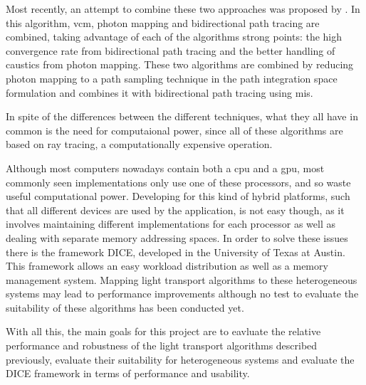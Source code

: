 Most recently, an attempt to combine these two approaches was proposed by \cite{Georgiev}. In this algorithm, \gls{vcm}, photon mapping and bidirectional path tracing are combined, taking advantage of each of the algorithms strong points: the high convergence rate from bidirectional path tracing and the better handling of caustics from photon mapping. These two algorithms are combined by reducing photon mapping to a path sampling technique in the path integration space formulation and combines it with bidirectional path tracing using \gls{mis}.

In spite of the differences between the different techniques, what they all have in common is the need for computaional power, since all of these algorithms are based on ray tracing, a computationally expensive operation.

Although most computers nowadays contain both a \gls{cpu} and a \gls{gpu}, most commonly seen implementations only use one of these processors, and so waste useful computational power. Developing for this kind of hybrid platforms, such that all different devices are used by the application, is not easy though, as it involves maintaining different implementations for each processor as well as dealing with separate memory addressing spaces. In order to solve these issues there is the framework DICE, developed in the University of Texas at Austin. This framework allows an easy workload distribution as well as a memory management system. Mapping light transport algorithms to these heterogeneous systems may lead to performance improvements although no test to evaluate the suitability of these algorithms has been conducted yet. 

With all this, the main goals for this project are to eavluate the relative performance and robustness of the light transport algorithms described previously, evaluate their suitability for heterogeneous systems and evaluate the DICE framework in terms of performance and usability.